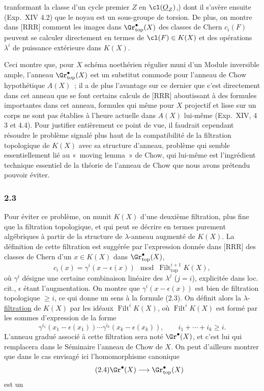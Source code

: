tranformant la classe d'un cycle premier $Z$ en $\cl(\underline O_Z)$,) dont il s'avère ensuite (Exp.\ XIV 4.2) que le noyau est un sous-groupe de torsion. De plus, on montre dans [RRR] comment les images dans $\Gr^{\bullet}_{\mathrm{top}}(X)$ des classes de Chern $c_i(F)$ peuvent se calculer directement en termes de $\cl(F)\in K(X)$ et des opérations $\lambda^i$ de puissance extérieure dans $K(X)$.

Ceci montre que, pour $X$ schéma noethérien régulier muni d'un Module inversible ample, l'anneau $\Gr^{\bullet}_{\mathrm{top}}(X)$ est un substitut commode pour l'anneau de Chow hypothétique $A(X)$~; il a de plus l'avantage sur ce dernier que c'est directement dans cet anneau que se font certains calculs de [RRR] aboutissant à des formules importantes dans cet anneau, formules qui même pour $X$ projectif et lisse sur un corps ne sont pas établies à l'heure actuelle dans $A(X)$ lui-même (Exp.\ XIV, 4 3 et 4.4). Pour justifier entièrement ce point de vue, il faudrait cependant résoudre le problème signalé plus haut de la compatibilité de la filtration topologique de $K(X)$ avec sa structure d'anneau, problème qui semble essentiellement lié au «~moving lemma~» de Chow, qui lui-même est l'ingrédient technique essentiel de la théorie de l'anneau de Chow que nous avons prétendu pouvoir éviter.

\subsubsection*{2.3}
Pour éviter ce problème, on munit $K(X)$ d'une deuxième filtration, plus fine que la filtration topologique, et qui peut se décrire en termes purement algébriques à partir de la structure de $\lambda$-anneau augmenté de $K(X)$. La définition de cette filtration est suggérée par l'expression donnée dans [RRR] des classes de Chern d'un $x\in K(X)$ dans $\Gr^{\bullet}_{\mathrm{top}}(X)$,
\begin{equation}\tag{2.3}
c_i(x)=\gamma^i(x-\epsilon(x))\mod \operatorname{Filt}^{i+1}_{\mathrm{top}}K(X),
\end{equation}
où $\gamma^i$ désigne une certaine combinaison linéaire des $\lambda^j$ ($j=i$), explicitée dans loc. cit., $\epsilon$ étant l'augmentation. On montre que $\gamma^i(x-\epsilon(x))$ est bien de filtration topologique $\ge i$, ce qui donne un sens à la formule (2.3). On définit alors la $\lambda$-\underline{filtration} de $K(X)$ par les idéaux $\operatorname{Filt}^i K(X)$, où $\operatorname{Filt}^i K(X)$ est formé par les sommes d'expression de la forme
\[
\gamma^{i_1}(x_1-\epsilon(x_1))\cdots \gamma^{i_k}(x_k-\epsilon(x_k)),\qquad i_1+\cdots+i_k\ge i.
\]
L'anneau gradué associé à cette filtration sera noté $\Gr^\bullet(X)$, et c'est lui qui remplacera dans le Séminaire l'anneau de Chow de $X$. On peut d'ailleurs montrer que dans le cas envisagé ici l'homomorphisme canonique
\begin{equation}\tag{2.4}
\Gr^\bullet(X)\longrightarrow \Gr^{\bullet}_{\mathrm{top}}(X)
\end{equation}
est un

